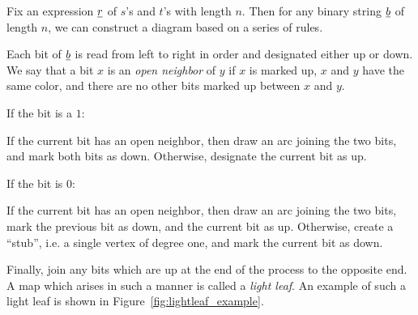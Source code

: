 Fix an expression $\underline{r}$ of $s$'s and $t$'s with length $n$.  Then for any binary string $\underline{b}$ of length $n$, we can construct a diagram based on a series of rules.

Each bit of $\underline{b}$ is read from left to right in order and designated either up or down.  We say that a bit $x$ is an \emph{open neighbor} of $y$ if $x$ is marked up, $x$ and $y$ have the same color, and there are no other bits marked up between $x$ and $y$.
\begin{itemize}
	\ii If the bit is a $1$:
	\begin{itemize}
		\ii If the current bit has an open neighbor, then draw an arc joining the two bits, and mark both bits as down.
		\ii Otherwise, designate the current bit as up.
	\end{itemize}
	\ii If the bit is $0$:
	\begin{itemize}
		\ii If the current bit has an open neighbor, then draw an arc joining the two bits, mark the previous bit as down, and the current bit as up.
		\ii Otherwise, create a ``stub'', i.e. a single vertex of degree one, and mark the current bit as down.
	\end{itemize}
\end{itemize}
Finally, join any bits which are up at the end of the process to the opposite end.  A map which arises in such a manner is called a \emph{light leaf}.  An example of such a light leaf is shown in Figure~\ref{fig:lightleaf_example}.

